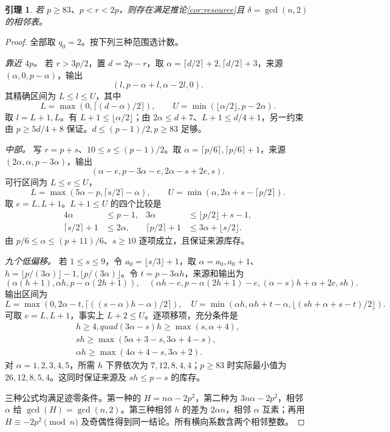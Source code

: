 \documentclass[11pt,a4paper]{article}
\newtheorem{lemma}[theorem]{引理}
\theoremstyle{definition}
\numberwithin{equation}{section}
\begin{document}
\begin{lemma}\label{lem:upper-supply}
若 $p\ge83$、$p<r<2p$，则存在满足推论\ref{cor:resource}且 $\delta=\gcd(n,2)$ 的相邻表。
\end{lemma}
\begin{proof}
全部取 $q_0=2$。按下列三种范围选计数。

\emph{靠近 $4p$。} 若 $r>3p/2$，置 $d=2p-r$，取 $\alpha=\lceil d/2\rceil+2,\lceil d/2\rceil+3$，来源 $(\alpha,0,p-\alpha)$，输出
\[(l,p-\alpha+l,\alpha-2l,0).
\]
其精确区间为 $L\le l\le U$，其中
\[L=\max(0,\lceil(d-\alpha)/2\rceil),\qquad
U=\min(\lfloor\alpha/2\rfloor,p-2\alpha).
\]
取 $l=L+1,L$。有 $L+1\le\lfloor\alpha/2\rfloor$；由 $2\alpha\le d+7$、$L+1\le d/4+1$，另一约束由 $p\ge5d/4+8$ 保证。$d\le(p-1)/2,p\ge83$ 足够。

\emph{中部。} 写 $r=p+s$、$10\le s\le(p-1)/2$。取 $\alpha=\lceil p/6\rceil,\lceil p/6\rceil+1$，来源 $(2\alpha,\alpha,p-3\alpha)$，输出
\[(\alpha-e,p-3\alpha-e,2\alpha-s+2e,s).
\]
可行区间为 $L\le e\le U$，
\[L=\max(5\alpha-p,\lceil s/2\rceil-\alpha),\qquad
U=\min(\alpha,2\alpha+s-\lceil p/2\rceil).
\]
取 $e=L,L+1$。$L+1\le U$ 的四个比较是
\begin{align*}
4\alpha&\le p-1,&3\alpha&\le\lfloor p/2\rfloor+s-1,\\
\lceil s/2\rceil+1&\le2\alpha,&\lceil p/2\rceil+1&\le3\alpha+\lfloor s/2\rfloor.
\end{align*}
由 $p/6\le\alpha\le(p+11)/6$、$s\ge10$ 逐项成立，且保证来源库存。

\emph{九个低偏移。} 若 $1\le s\le9$，令 $a_0=\lfloor s/3\rfloor+1$，取 $\alpha=a_0,a_0+1$、$h=\lfloor p/(3\alpha)\rfloor-1,\lfloor p/(3\alpha)\rfloor$。令 $t=p-3\alpha h$，来源和输出为
\[
(\alpha(h+1),\alpha h,p-\alpha(2h+1)),\quad
(\alpha h-e,p-\alpha(2h+1)-e,(\alpha-s)h+\alpha+2e,sh).
\]
输出区间为
\[
L=\max(0,2\alpha-t,\lceil((s-\alpha)h-\alpha)/2\rceil),\quad
U=\min(\alpha h,\alpha h+t-\alpha,\lfloor(sh+\alpha+s-t)/2\rfloor).
\]
可取 $e=L,L+1$，事实上 $L+2\le U$。逐项移项，充分条件是
\[
\begin{gathered}
h\ge4,quad(3\alpha-s)h\ge\max(s,\alpha+4),\\
sh\ge\max(5\alpha+3-s,3\alpha+4-s),\\
\alpha h\ge\max(4\alpha+4-s,3\alpha+2).
\end{gathered}
\]
对 $\alpha=1,2,3,4,5$，所需 $h$ 下界依次为 $7,12,8,4,4$；$p\ge83$ 时实际最小值为 $26,12,8,5,4$。这同时保证来源及 $sh\le p-s$ 的库存。

三种公式均满足迹零条件。第一种的 $H=n\alpha-2p^2$，第二种为 $3n\alpha-2p^2$，相邻 $\alpha$ 给 $\gcd(H)=\gcd(n,2)$。第三种相邻 $h$ 的差为 $2\alpha n$，相邻 $\alpha$ 互素；再用 $H\equiv-2p^2\pmod n$ 及奇偶性得到同一结论。所有横向系数含两个相邻整数。
\end{proof}
\end{document}
